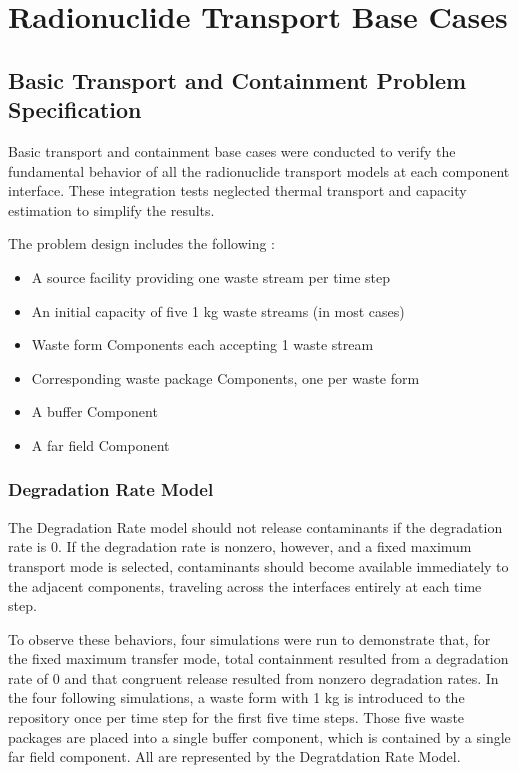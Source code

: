 \section{Radionuclide Transport Base Cases}\label{sec:nuclide_base_cases}
\subsection{Basic Transport and Containment Problem Specification}
Basic transport and containment base cases were conducted to verify the 
fundamental behavior of all the radionuclide transport models at each component 
interface. These integration tests neglected thermal transport and capacity 
estimation to simplify the results.  

The problem design includes the following : 
\begin{itemize}
\item{A source facility providing one waste stream per time step}
\item{An initial capacity of five 1 kg waste streams (in most cases)}
\item{Waste form Components each accepting 1 waste stream} 
\item{Corresponding waste package Components, one per waste form}
\item{A buffer Component}
\item{A far field Component}
\end{itemize}

\subsubsection{Degradation Rate Model}
The Degradation Rate model should not release contaminants if the degradation 
rate is 0. If the degradation rate is nonzero, however, and a fixed maximum 
transport mode is selected, contaminants should become available immediately to 
the adjacent components, traveling across the interfaces entirely at each 
time step. 

To observe these behaviors, four simulations were run to demonstrate that, for 
the fixed maximum transfer mode, total 
containment resulted from a degradation rate of 0 and that congruent release 
resulted from nonzero degradation rates. 
In the four following simulations, a waste form with 1 kg is introduced to the repository once 
per time step for the first five time steps. Those five waste packages are 
placed into a single buffer component, which is contained by a single far field 
component. All are represented by the Degratdation Rate Model. 

